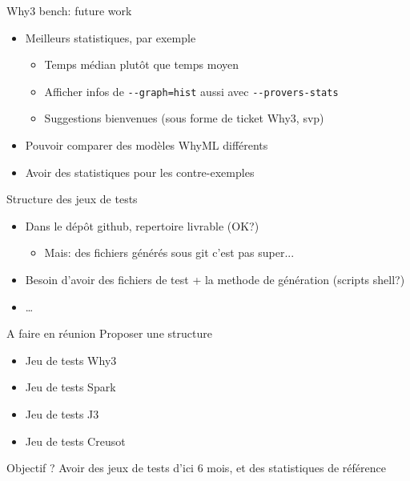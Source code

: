 \documentclass{beamer}
\newcommand{\why}{\lstinline[language=why3]}
\begin{document}
\begin{frame}{Why3 bench: future work}

  \begin{itemize}
  \item Meilleurs statistiques, par exemple
    \begin{itemize}
    \item Temps médian plutôt que temps moyen
    \item Afficher infos de \why{--graph=hist} aussi avec \why{--provers-stats}
    \item Suggestions bienvenues (sous forme de ticket Why3, svp)
  \end{itemize}

\item Pouvoir comparer des modèles WhyML différents

\item Avoir des statistiques pour les contre-exemples

\end{itemize}

\end{frame}

\begin{frame}{Structure des jeux de tests}

  \begin{itemize}
  \item Dans le dépôt github, repertoire livrable (OK?)
    \begin{itemize}
    \item Mais: des fichiers générés sous git c'est pas super...
    \end{itemize}
  \item Besoin d'avoir des fichiers de test + la methode de génération (scripts shell?)
  \item \ldots
  \end{itemize}

  \begin{block}{A faire en réunion}
    Proposer une structure
    \begin{itemize}
    \item Jeu de tests Why3
    \item Jeu de tests Spark
    \item Jeu de tests J3
    \item Jeu de tests Creusot
    \end{itemize}
  \end{block}

  \begin{block}{Objectif ?}
    Avoir des jeux de tests d'ici 6 mois, et des statistiques de référence
  \end{block}

\end{frame}
\end{document}
